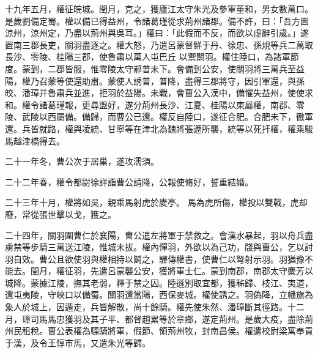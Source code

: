 \begin{pinyinscope}
 
十九年五月，權征皖城。閏月，克之，獲廬江太守朱光及參軍董和，男女數萬口。是歲劉備定蜀。權以備已得益州，令諸葛瑾從求荊州諸郡。備不許，曰：「吾方圖涼州，涼州定，乃盡以荊州與吳耳。」權曰：「此假而不反，而欲以虛辭引歲。」遂置南三郡長吏，關羽盡逐之。權大怒，乃遣呂蒙督鮮于丹、徐忠、孫規等兵二萬取長沙、零陵、桂陽三郡，使魯肅以萬人屯巴丘
 以禦關羽。權住陸口，為諸軍節度。蒙到，二郡皆服，惟零陵太守郝普未下。會備到公安，使關羽將三萬兵至益陽，權乃召蒙等使還助肅。蒙使人誘普，普降，盡得三郡將守，因引軍還，與孫皎、潘璋并魯肅兵並進，拒羽於益陽。未戰，會曹公入漢中，備懼失益州，使使求和。權令諸葛瑾報，更尋盟好，遂分荊州長沙、江夏、桂陽以東屬權，南郡、零陵、武陵以西屬備。備歸，而曹公已還。權反自陸口，遂征合肥。合肥未下，徹軍還。兵皆就路，權與凌統、甘寧等在津北為魏將張遼所襲，統等以死扞權，權乘駿馬越津橋得去。
 
 
 
 
 二十一年冬，曹公次于居巢，遂攻濡須。
 
 
 
 
 二十二年春，權令都尉徐詳詣曹公請降，公報使脩好，誓重結婚。
 
 
二十三年十月，權將如吳，親乘馬射虎於庱亭。
 馬為虎所傷，權投以雙戟，虎却廢，常從張世擊以戈，獲之。
 
 
二十四年，關羽圍曹仁於襄陽，曹公遣左將軍于禁救之。會漢水暴起，羽以舟兵盡虜禁等步騎三萬送江陵，惟城未拔。權內憚羽，外欲以為己功，牋與曹公，乞以討羽自效。曹公且欲使羽與權相持以鬬之，驛傳權書，使曹仁以弩射示羽。羽猶豫不能去。閏月，權征羽，先遣呂蒙襲公安，獲將軍士仁。蒙到南郡，南郡太守麋芳以城降。蒙據江陵，撫其老弱，釋于禁之囚。陸遜別取宜都，獲秭歸、枝江、夷道，還屯夷陵，守峽口以備蜀。關羽還當陽，西保麥城。權使誘之。羽偽降，立幡旗為象人於城上，因遁走，兵皆解散，尚十餘騎。權先使朱然、潘璋斷其徑路。十二月，璋司馬馬忠獲羽及其子平、都督趙累等於章鄉，遂定荊州。是歲大疫，盡除荊州民租稅。曹公表權為驃騎將軍，假節、領荊州牧，封南昌侯。權遣校尉梁寓奉貢于漢，及令王惇市馬，又遣朱光等歸。
 

\end{pinyinscope}
